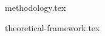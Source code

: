 \documentclass[a4paper,11pt,twoside]{report}
\begin{document}






{methodology.tex}




{theoretical-framework.tex}


\end{document}

